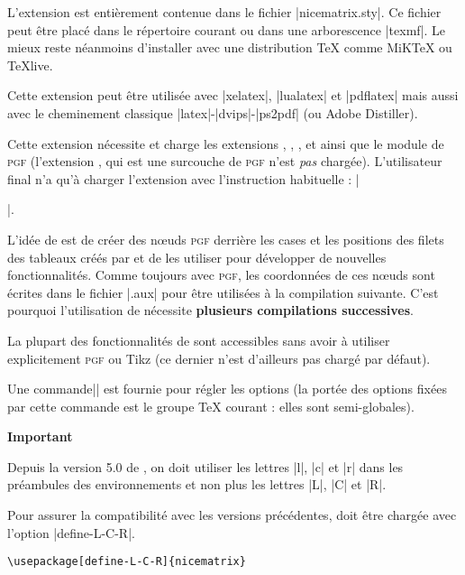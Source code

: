 \documentclass[dvipsnames]{article}%
\begin{document}
\vspace{1cm}

L'extension  est entièrement contenue dans le fichier |nicematrix.sty|. Ce fichier peut être placé
dans le répertoire courant ou dans une arborescence |texmf|. Le mieux reste néanmoins d'installer 
avec une distribution TeX comme MiKTeX ou TeXlive.

\bigskip
Cette extension peut être utilisée avec |xelatex|, |lualatex| et |pdflatex| mais aussi avec le cheminement
classique |latex|-|dvips|-|ps2pdf| (ou Adobe Distiller). 

\bigskip
Cette extension nécessite et charge les extensions , , ,  et
 ainsi que le module  de \textsc{pgf} (l'extension , qui est une surcouche de
\textsc{pgf} n'est \emph{pas} chargée). L'utilisateur final n'a qu'à charger l'extension  avec
l'instruction habituelle : |\usepackage{nicematrix}|.


\bigskip
L'idée de  est de créer des nœuds \textsc{pgf} derrière les cases et les positions des filets des
tableaux créés par  et de les utiliser pour développer de nouvelles fonctionnalités. Comme toujours avec
\textsc{pgf}, les coordonnées de ces nœuds sont écrites dans le fichier |.aux| pour être utilisées à la
compilation suivante. C'est pourquoi l'utilisation de  nécessite \textbf{plusieurs compilations
  successives}.  

\bigskip
La plupart des fonctionnalités de  sont accessibles sans avoir à utiliser explicitement
\textsc{pgf} ou Tikz (ce dernier n'est d'ailleurs pas chargé par défaut).

\bigskip
Une commande|\NiceMatrixOptions| est fournie pour régler les options (la portée des options fixées par cette
commande est le groupe TeX courant : elles sont semi-globales).


\bigskip
{\bfseries \color{red} Important

Depuis la version 5.0 de , on doit utiliser les lettres |l|, |c| et
|r| dans les préambules des environnements et non plus les lettres |L|, |C| et
|R|.

Pour assurer la compatibilité avec les versions précédentes, 
doit être chargée avec l'option |define-L-C-R|.
\begin{Verbatim}
\usepackage[define-L-C-R]{nicematrix}
\end{Verbatim}
}
\end{document}
